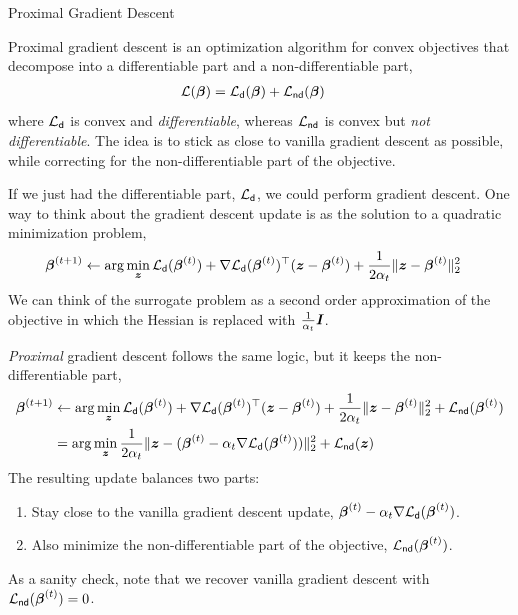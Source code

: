\documentclass[aspectratio=169]{beamer}
\begin{document}
\begin{frame}[t,allowframebreaks]{Proximal Gradient
Descent}\label{proximal-gradient-descent}

Proximal gradient descent is an optimization algorithm for convex
objectives that decompose into a differentiable part and a
non-differentiable part, \begin{align*}
\mathcal{L}(\boldsymbol{\beta}) &= \mathcal{L}_{\mathsf{d}}(\boldsymbol{\beta}) + \mathcal{L}_{\mathsf{nd}}(\boldsymbol{\beta})
\end{align*} where \(\mathcal{L}_{\mathsf{d}}\) is convex and
\emph{differentiable}, whereas \(\mathcal{L}_{\mathsf{nd}}\) is convex but
\emph{not differentiable}. The idea is to stick as close to vanilla
gradient descent as possible, while correcting for the
non-differentiable part of the objective.

If we just had the differentiable part, \(\mathcal{L}_{\mathsf{d}}\), we could
perform gradient descent. One way to think about the gradient descent
update is as the solution to a quadratic minimization problem,
\begin{align*}
\boldsymbol{\beta}^{(t+1)} &\leftarrow 
\arg \min_{\boldsymbol{z}} \mathcal{L}_{\mathsf{d}}(\boldsymbol{\beta}^{(t)}) + \nabla \mathcal{L}_{\mathsf{d}}(\boldsymbol{\beta}^{(t)})^\top (\boldsymbol{z} - \boldsymbol{\beta}^{(t)}) + \frac{1}{2 \alpha_t} \| \boldsymbol{z} - \boldsymbol{\beta}^{(t)}\|_2^2
\end{align*} We can think of the surrogate problem as a second order
approximation of the objective in which the Hessian is replaced with
\(\frac{1}{\alpha_t} \boldsymbol{I}\).

\emph{Proximal} gradient descent follows the same logic, but it keeps
the non-differentiable part, \begin{align*}
\boldsymbol{\beta}^{(t+1)} &\leftarrow 
\arg \min_{\boldsymbol{z}} \mathcal{L}_{\mathsf{d}}(\boldsymbol{\beta}^{(t)}) + \nabla \mathcal{L}_{\mathsf{d}}(\boldsymbol{\beta}^{(t)})^\top (\boldsymbol{z} - \boldsymbol{\beta}^{(t)}) + \frac{1}{2 \alpha_t} \| \boldsymbol{z} - \boldsymbol{\beta}^{(t)}\|_2^2 + \mathcal{L}_{\mathsf{nd}}(\boldsymbol{\beta}^{(t)}) \\
&= \arg \min_{\boldsymbol{z}} \frac{1}{2 \alpha_t} \| \boldsymbol{z} - (\boldsymbol{\beta}^{(t)} - \alpha_t \nabla \mathcal{L}_{\mathsf{d}}(\boldsymbol{\beta}^{(t)})) \|_2^2 + \mathcal{L}_{\mathsf{nd}}(\boldsymbol{z}) \\
\end{align*} The resulting update balances two parts: 
\begin{enumerate}
    \item  Stay close to
the vanilla gradient descent update,
\(\boldsymbol{\beta}^{(t)} - \alpha_t \nabla \mathcal{L}_{\mathsf{d}}(\boldsymbol{\beta}^{(t)})\).

    \item Also minimize the non-differentiable part of the objective,
\(\mathcal{L}_{\mathsf{nd}}(\boldsymbol{\beta}^{(t)})\).
\end{enumerate}

As a sanity check, note that we recover vanilla gradient descent with
\(\mathcal{L}_{\mathsf{nd}}(\boldsymbol{\beta}^{(t)}) = 0\).
\end{frame}
\end{document}
